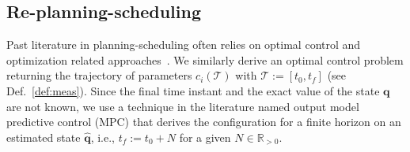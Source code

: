 \documentclass[letterpaper,10pt,journal,twoside]{IEEEtran}
\theoremstyle{definition}
\begin{document}
\vspace*{-1.4ex}
\subsection{Re-planning-scheduling}
\label{sec:repla-algo}

Past literature in planning-scheduling often relies on optimal control and optimization related approaches~\cite{brateman2006energy,zhang2007low,ondruska2015scheduled,lahijanian2018resource}. We similarly derive an optimal control problem returning the trajectory of parameters $c_i(\mathcal{T})$ with $\mathcal{T}:=[t_0,t_f]$ (see Def.~\ref{def:meas}). Since the final time instant and the exact value of the state $\mathbf{q}$ are not known, we use a technique in the literature named output model predictive control (MPC) that derives the configuration for a finite horizon on an estimated state $\hat{\mathbf{q}}$, i.e., $t_f:=t_0+N$ for a given $N\in\mathbb{R}_{>0}$.
\end{document}
